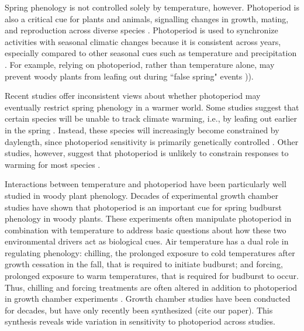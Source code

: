 \documentclass{article}
\begin{document}
\par Spring phenology is not controlled solely by temperature, however. Photoperiod is also a critical cue for plants and animals, signalling changes in growth, mating, and reproduction across diverse species \citep[e.g.,][]{Howe:1996,Flynn:2018,solbakken1994,mcallan2006,lagercrantz2009}. Photoperiod is used to synchronize activities with seasonal climatic changes \citep[e.g.,][]{Hsu:2011,Singh:2017,Basler:2012} because it is consistent across years, especially compared to other seasonal cues such as temperature and precipitation \citep{saikkonen2012}. For example, relying on photoperiod, rather than temperature alone, may prevent woody plants from leafing out during ``false spring" events \citep[unusually warm periods during winter that are followed by a return of cold temperatures][] {Gu2008})). 

\par Recent studies offer inconsistent views about whether photoperiod may eventually restrict spring phenology in a warmer world. Some studies suggest that certain species will be unable to track climate warming, i.e., by leafing out earlier in the spring \citep{koerner2010b,way2015}. Instead, these species will increasingly become constrained by daylength, since photoperiod sensitivity is primarily genetically controlled \citep{bradshaw2008}. Other studies, however, suggest that photoperiod is unlikely to constrain responses to warming for most species \citep{zohner2016,chuine2010}.

\par Interactions between temperature and photoperiod have been particularly well studied in woody plant phenology. Decades of experimental growth chamber studies have shown that photoperiod is an important cue for spring budburst phenology in woody plants. These experiments often manipulate photoperiod in combination with temperature to address basic questions about how these two environmental drivers act as biological cues. Air temperature has a dual role in regulating phenology: chilling, the prolonged exposure to cold temperatures after growth cessation in the fall, that is required to initiate budburst; and forcing, prolonged exposure to warm temperatures, that is required for budburst to occur. Thus, chilling and forcing treatments are often altered in addition to photoperiod in growth chamber experiments \citep[e.g.,][]{Campbell:1975aa,HEIDE:1977aa,Falusi:1990aa,Spann:2004aa,Laube:2014a}. Growth chamber studies have been conducted for decades, but have only recently been synthesized (cite our paper). This synthesis reveals wide variation in sensitivity to photoperiod across studies. 
\end{document}
